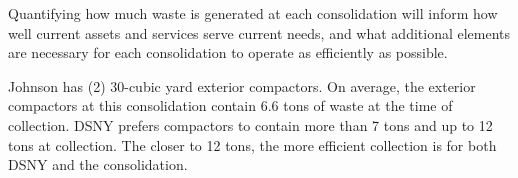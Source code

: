 
    Quantifying how much waste is generated at each consolidation will inform how well current assets and services serve current needs, and what additional elements are necessary for each consolidation to operate as efficiently as possible.
    
    Johnson has (2) 30-cubic yard exterior compactors. On average, the exterior compactors at this consolidation contain 6.6 tons of waste at the time of collection. DSNY prefers compactors to contain more than 7 tons and up to 12 tons at collection. The closer to 12 tons, the more efficient collection is for both DSNY and the consolidation.
